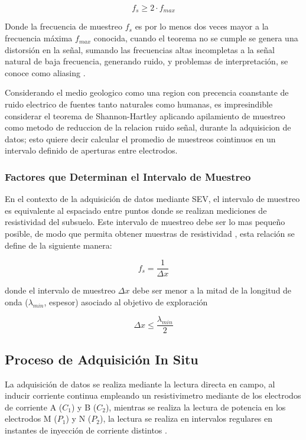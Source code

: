 			\begin{equation}
				f_{s} \geq 2 \cdot f_{max}
			\end{equation}
			
			Donde la frecuencia de muestreo $f_{s}$ es por lo menos dos veces mayor a la frecuencia máxima $f_{max}$ conocida, cuando el teorema no se cumple se genera una distorsión en la señal, sumando las frecuencias altas incompletas a la señal natural de baja frecuencia, generando ruido, y problemas de interpretación, se conoce como aliasing \citep{alvarado2010}. 
			
			Considerando el medio geologico como una region con precencia coanstante de ruido electrico de fuentes tanto naturales como humanas, es impresindible considerar el teorema de Shannon-Hartley aplicando apilamiento de muestreo como metodo de reduccion de la relacion ruido señal, durante la adquisicion de datos; esto quiere decir calcular el promedio de muestreos cointinuos en un intervalo definido de aperturas entre electrodos.
			
				
			\subsubsection{Factores que Determinan el Intervalo de Muestreo}
		
				En el contexto de la adquisición de datos mediante SEV, el intervalo de muestreo es equivalente al espaciado entre puntos donde se realizan mediciones de resistividad del subsuelo. Este intervalo de muestreo debe ser lo mas pequeño posible, de modo que permita obtener muestras de resistividad \citep{telford1990}, esta relación se define de la siguiente manera:
				
				\begin{equation}
					f_{s}= \frac{1}{\Delta x}
				\end{equation}
				
				donde el intervalo de muestreo $\Delta x$ debe ser menor a la mitad de la longitud de onda ($\lambda_{min}$, espesor) asociado al objetivo de exploración
				
				\begin{equation}
					\Delta x \leq \frac{\lambda_{min} }{2}
				\end{equation}
				
				
			
		\subsection{Proceso de Adquisición In Situ}
			La adquisición de datos se realiza mediante la lectura directa en campo, al inducir corriente continua empleando un resistivimetro mediante de los electrodos de corriente A ($C_{1}$) y B ($C_{2}$), mientras se realiza la lectura de potencia en los electrodos M ($P_{1}$) y N ($P_{2}$), la lectura se realiza en intervalos regulares en instantes de inyección de corriente distintos \citep{telford1990}.
			
